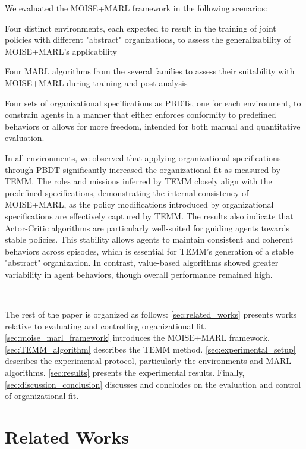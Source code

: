 \documentclass[sigconf,anonymous]{aamas}
\begin{document}
We evaluated the MOISE+MARL framework in the following scenarios:
\begin{enumerate*}[label={\roman*) },itemjoin={; \quad}]
  \item Four distinct environments, each expected to result in the training of joint policies with different "abstract" organizations, to assess the generalizability of MOISE+MARL's applicability
  \item Four MARL algorithms from the several families to assess their suitability with MOISE+MARL during training and post-analysis
  \item Four sets of organizational specifications as PBDTs, one for each environment, to constrain agents in a manner that either enforces conformity to predefined behaviors or allows for more freedom, intended for both manual and quantitative evaluation.
\end{enumerate*}

In all environments, we observed that applying organizational specifications through PBDT significantly increased the organizational fit as measured by TEMM. The roles and missions inferred by TEMM closely align with the predefined specifications, demonstrating the internal consistency of MOISE+MARL, as the policy modifications introduced by organizational specifications are effectively captured by TEMM.
The results also indicate that Actor-Critic algorithms are particularly well-suited for guiding agents towards stable policies. This stability allows agents to maintain consistent and coherent behaviors across episodes, which is essential for TEMM's generation of a stable "abstract" organization. In contrast, value-based algorithms showed greater variability in agent behaviors, though overall performance remained high.

\

\noindent The rest of the paper is organized as follows: \autoref{sec:related_works} presents works relative to evaluating and controlling organizational fit. \autoref{sec:moise_marl_framework} introduces the MOISE+MARL framework. \autoref{sec:TEMM_algorithm} describes the TEMM method. \autoref{sec:experimental_setup} describes the experimental protocol, particularly the environments and MARL algorithms. \autoref{sec:results} presents the experimental results. Finally, \autoref{sec:discussion_conclusion} discusses and concludes on the evaluation and control of organizational fit.


\section{Related Works}
\label{sec:related_works}
\end{document}
